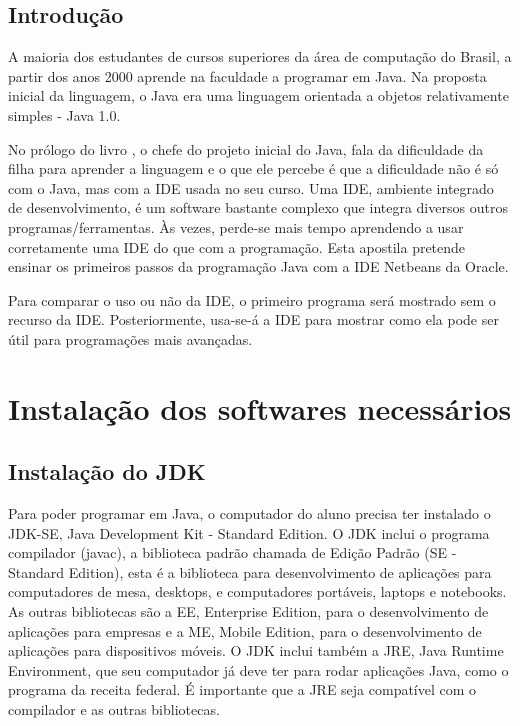 \documentclass[
	12pt,				%
	openright,			%
	twoside,			%
	a4paper,			%
	english,			%
	french,				%
	spanish,			%
	brazil				%
	]{abntex2}
\begin{document}
\chapter{Introdução}

A maioria dos estudantes de cursos superiores da área de computação do Brasil, a partir dos anos 2000 aprende na faculdade a programar em Java. Na proposta inicial da linguagem, o Java era uma linguagem orientada a objetos relativamente simples - Java 1.0.

No prólogo do livro \cite{livro-bluej}, o chefe do projeto inicial do Java, fala da dificuldade da filha para aprender a linguagem e o que ele percebe é que a dificuldade não é só com o Java, mas com a IDE usada no seu curso. Uma IDE, ambiente integrado de desenvolvimento, é um software bastante complexo que integra diversos outros programas/ferramentas. Às vezes, perde-se mais tempo aprendendo a usar corretamente uma IDE do que com a programação. Esta apostila pretende ensinar os primeiros passos da programação Java com a IDE Netbeans da Oracle.

Para comparar o uso ou não da IDE, o primeiro programa será mostrado sem o recurso da IDE. Posteriormente, usa-se-á a IDE para mostrar como ela pode ser útil para programações mais avançadas.

\part{Instalação dos softwares necessários}

\chapter{Instalação do JDK}

Para poder programar em Java, o computador do aluno precisa ter instalado o JDK-SE, Java Development Kit - Standard Edition. O JDK inclui o programa compilador (javac), a biblioteca padrão chamada de Edição Padrão (SE - Standard Edition), esta é a biblioteca para desenvolvimento de aplicações para computadores de mesa, desktops, e computadores portáveis, laptops e notebooks. As outras bibliotecas são a EE, Enterprise Edition, para o desenvolvimento de aplicações para empresas e a ME, Mobile Edition, para o desenvolvimento de aplicações para dispositivos móveis. O JDK inclui também a JRE, Java Runtime Environment, que seu computador já deve ter para rodar aplicações Java, como o programa da receita federal. É importante que a JRE seja compatível com o compilador e as outras bibliotecas.
\end{document}
